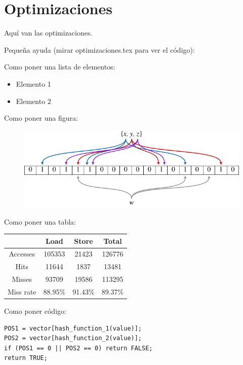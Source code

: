 \section{Optimizaciones}

Aqu\'{i} van las optimizaciones.

Peque\~{n}a ayuda (mirar optimizaciones.tex para ver el c\'{o}digo):

Como poner una lista de elementos:
\begin{itemize}
   \item Elemento 1
   \item Elemento 2
\end{itemize}

Como poner una figura:
\begin{figure}[ht]
   \centering
   \includegraphics[keepaspectratio=true,width=.6\textwidth]{figures/muestra}
\end{figure}

Como poner una tabla:
\begin{center}
   \begin{tabular}{| c || c | c | c |}
      \hline
      	           & Load	& Store		& Total		\\ \hline \hline
	Accesses   & 105353	& 21423		& 126776	\\ \hline
	Hits       &  11644	&  1837		&  13481	\\ \hline
	Misses     &  93709 	& 19586		& 113295	\\ \hline
	Miss rate  & 88.95\%	& 91.43\%	& 89.37\%	\\ \hline
   \end{tabular}
\end{center}

Como poner c\'{o}digo:
\begin{verbatim}
POS1 = vector[hash_function_1(value)];
POS2 = vector[hash_function_2(value)];
if (POS1 == 0 || POS2 == 0) return FALSE;
return TRUE;
\end{verbatim}

